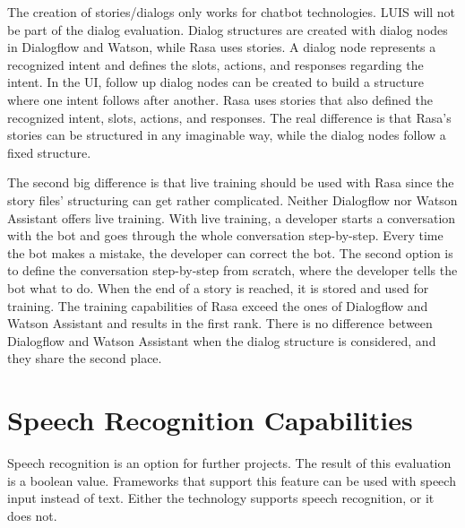 The creation of stories/dialogs only works for chatbot technologies.
LUIS will not be part of the dialog evaluation.
Dialog structures are created with dialog nodes in Dialogflow and Watson, while Rasa uses stories.
A dialog node represents a recognized intent and defines the slots, actions, and responses regarding the intent.
In the UI, follow up dialog nodes can be created to build a structure where one intent follows after another.
Rasa uses stories that also defined the recognized intent, slots, actions, and responses.
The real difference is that Rasa's stories can be structured in any imaginable way, while the dialog nodes follow a fixed structure.

The second big difference is that live training should be used with Rasa since the story files' structuring can get rather complicated.
Neither Dialogflow nor Watson Assistant offers live training.
With live training, a developer starts a conversation with the bot and goes through the whole conversation step-by-step.
Every time the bot makes a mistake, the developer can correct the bot.
The second option is to define the conversation step-by-step from scratch, where the developer tells the bot what to do.
When the end of a story is reached, it is stored and used for training.
The training capabilities of Rasa exceed the ones of Dialogflow and Watson Assistant and results in the first rank. 
There is no difference between Dialogflow and Watson Assistant when the dialog structure is considered, and they share the second place.


\section*{Speech Recognition Capabilities}
Speech recognition is an option for further projects. 
The result of this evaluation is a boolean value.
Frameworks that support this feature can be used with speech input instead of text.
Either the technology supports speech recognition, or it does not. 

